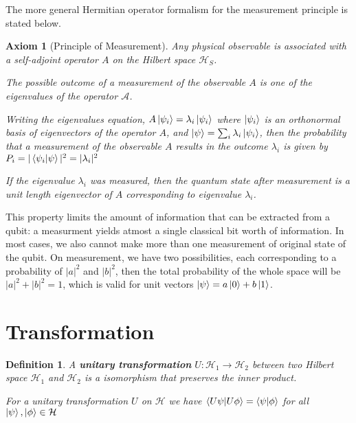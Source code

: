 \documentclass[12pt,twoside,fleqn]{report}
\theoremstyle{thmstyle}
\newtheorem{defn}{Definition}[chapter]
\newtheorem{axiom}{Axiom}[chapter]
\begin{document}
The more general Hermitian operator formalism for the measurement principle is stated below.

\begin{mdframed}
\begin{axiom}[Principle of Measurement]
Any physical observable is associated with a self-adjoint operator $A$ on the Hilbert space $\mathcal{H}_S$. 

The possible outcome of a measurement of the observable $A$ is one of the eigenvalues of the operator $\mathcal{A}$.

Writing the eigenvalues equation, $A \ket{\psi_i} = \lambda_i \ket{\psi_i}$ where $\ket{\psi_i}$ is an orthonormal basis of eigenvectors of the operator $A$, and  $\ket{\psi} = \sum_i \lambda_i \ket{\psi_i}$,  then the probability that a measurement of the observable $A$ results in the outcome $\lambda_i$ is given by $P_i = |\braket{\psi_i|\psi}|^2 = |\lambda_i|^2$

If the eigenvalue $\lambda_i$ was measured, then the quantum state after measurement is a unit length eigenvector of $A$ corresponding to eigenvalue $\lambda_i$.
\end{axiom}
\end{mdframed}


This property limits the amount of information that can be extracted from a qubit: a measurment yields atmost a single classical bit worth of information. In most cases, we also cannot make more than one measurement of original state of the qubit. On measurement, we have two possibilities, each corresponding to a probability of $|a|^2$ and $|b|^2$, then the total probability of the whole space will be $|a|^2 + |b|^2 = 1$, which is valid for unit vectors $\ket{\psi} = a \ket{0} + b \ket{1}$.

\section{Transformation}

\begin{comment}
    * Unitary transformation
    * Unitary matrix and properties
    * Every transformation is unitary
    * No cloning principle, Rieffel Polak P73
    * A measurement cannot be a transformation
\end{comment}

\begin{defn}
    A \textbf{unitary transformation} $U: \mathcal{H}_1 \to \mathcal{H}_2$ between two Hilbert space $\mathcal{H}_1$ and $\mathcal{H}_2$ is a isomorphism that preserves the inner product.

    For a unitary transformation $U$ on $\mathcal{H}$ we have
    $\braket{U \psi | U \phi } = \braket{\psi | \phi }$ for all $\ket{\psi}, \ket{\phi} \in \mathcal{H}$

\end{defn}
\end{document}
